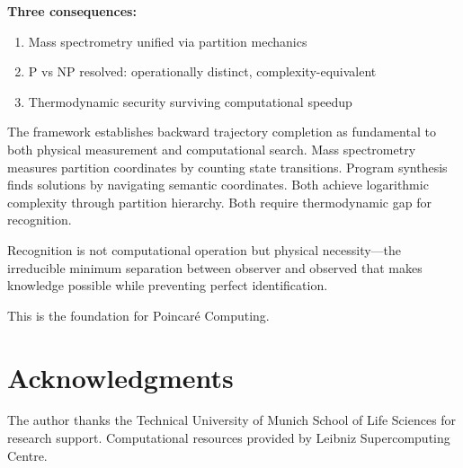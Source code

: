 \documentclass[twocolumn,10pt]{revtex4-2}
\theoremstyle{definition}
\theoremstyle{remark}
\begin{document}
\textbf{Three consequences:}
\begin{enumerate}
\item Mass spectrometry unified via partition mechanics
\item P vs NP resolved: operationally distinct, complexity-equivalent
\item Thermodynamic security surviving computational speedup
\end{enumerate}

The framework establishes backward trajectory completion as fundamental to both physical measurement and computational search. Mass spectrometry measures partition coordinates by counting state transitions. Program synthesis finds solutions by navigating semantic coordinates. Both achieve logarithmic complexity through partition hierarchy. Both require thermodynamic gap for recognition.

Recognition is not computational operation but physical necessity—the irreducible minimum separation between observer and observed that makes knowledge possible while preventing perfect identification.

This is the foundation for Poincaré Computing.


\section*{Acknowledgments}

The author thanks the Technical University of Munich School of Life Sciences for research support. Computational resources provided by Leibniz Supercomputing Centre.




\end{document}
